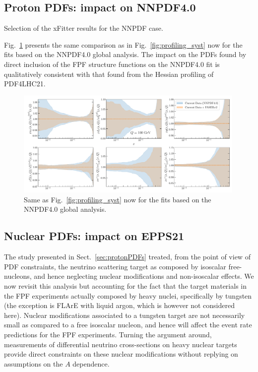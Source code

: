 \clearpage


\subsection{Proton PDFs: impact on NNPDF4.0}
\label{sec:nnpdf40}

Selection of the {\sc\small xFitter} results for the NNPDF case.

Fig.~\ref{fig:nnpdf40_fasernu2_baseline} presents the same comparison
as in Fig.~\ref{fig:profiling_syst} now for
 the fits
 based on the NNPDF4.0 global analysis.
 The impact on the PDFs found by direct inclusion of the FPF structure
 functions on the NNPDF4.0 fit is qualitatively consistent with
 that found from the Hessian profiling of PDF4LHC21.

\begin{figure}[t]
\centering
\includegraphics[width=0.99\textwidth]{plots/FASERnu2-q100gev-ratios.pdf}
\caption{
  Same as Fig.~\ref{fig:profiling_syst} now for the fits
  based on the NNPDF4.0 global analysis.
%
}
\label{fig:nnpdf40_fasernu2_baseline}
\end{figure}

\clearpage

\subsection{Nuclear PDFs: impact on EPPS21}
\label{sec:nuclearPDFs}

The study presented in Sect.~\ref{sec:protonPDFs} treated, from the point of view
of PDF constraints, the neutrino scattering target
as composed by isoscalar free-nucleons, and hence neglecting nuclear modifications
and non-isoscalar effects.
%
We now revisit this analysis but accounting for the fact that the target materials in the FPF
experiments actually
composed by heavy nuclei, specifically by tungsten (the exception is FLArE with liquid argon, which
is however not considered here).
%
Nuclear modifications associated to a tungsten target are not necessarily small as compared
to a free isoscalar nucleon, and hence will affect the event rate predictions for
the FPF experiments.
%
Turning the argument around, measurements of differential neutrino cross-sections
on heavy nuclear targets provide direct constraints on these nuclear modifications
without replying on assumptions on the $A$ dependence.

